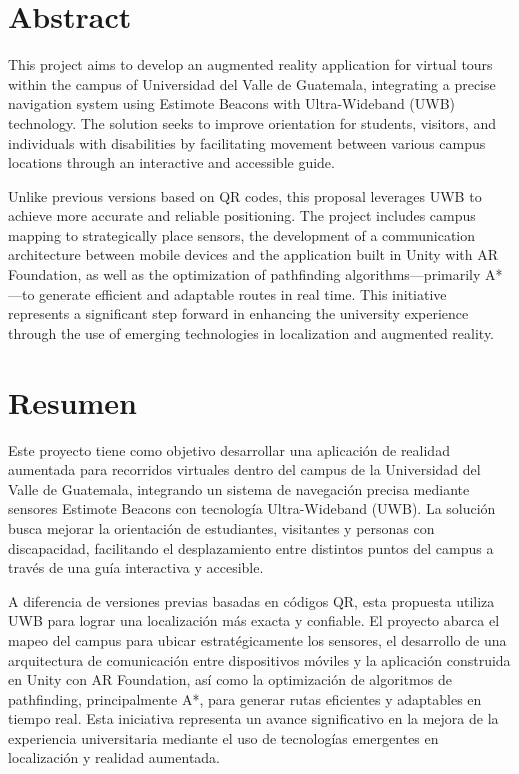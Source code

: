 \documentclass{article}
\begin{document}
\section{Abstract}
{\justify This project aims to develop an augmented reality application for virtual tours within the campus of Universidad del Valle de Guatemala, integrating a precise navigation system using Estimote Beacons with Ultra-Wideband (UWB) technology. The solution seeks to improve orientation for students, visitors, and individuals with disabilities by facilitating movement between various campus locations through an interactive and accessible guide.

Unlike previous versions based on QR codes, this proposal leverages UWB to achieve more accurate and reliable positioning. The project includes campus mapping to strategically place sensors, the development of a communication architecture between mobile devices and the application built in Unity with AR Foundation, as well as the optimization of pathfinding algorithms—primarily A*—to generate efficient and adaptable routes in real time. This initiative represents a significant step forward in enhancing the university experience through the use of emerging technologies in localization and augmented reality.}

\section{Resumen}
{\justify Este proyecto tiene como objetivo desarrollar una aplicación de realidad aumentada para recorridos virtuales dentro del campus de la Universidad del Valle de Guatemala, integrando un sistema de navegación precisa mediante sensores Estimote Beacons con tecnología Ultra-Wideband (UWB). La solución busca mejorar la orientación de estudiantes, visitantes y personas con discapacidad, facilitando el desplazamiento entre distintos puntos del campus a través de una guía interactiva y accesible.

A diferencia de versiones previas basadas en códigos QR, esta propuesta utiliza UWB para lograr una localización más exacta y confiable. El proyecto abarca el mapeo del campus para ubicar estratégicamente los sensores, el desarrollo de una arquitectura de comunicación entre dispositivos móviles y la aplicación construida en Unity con AR Foundation, así como la optimización de algoritmos de pathfinding, principalmente A*, para generar rutas eficientes y adaptables en tiempo real. Esta iniciativa representa un avance significativo en la mejora de la experiencia universitaria mediante el uso de tecnologías emergentes en localización y realidad aumentada.}
\end{document}
